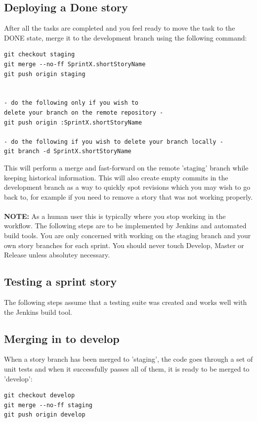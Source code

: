 \subsection{Deploying a Done story}

After all the tasks are completed and you feel ready to move the task to the DONE state, merge it to the development branch using the following command:\\

\begin{verbatim}
git checkout staging
git merge --no-ff SprintX.shortStoryName
git push origin staging


- do the following only if you wish to 
delete your branch on the remote repository -
git push origin :SprintX.shortStoryName

- do the following if you wish to delete your branch locally -  
git branch -d SprintX.shortStoryName
\end{verbatim}
This will perform a merge and fast-forward on the remote 'staging' branch while keeping historical information.
This will also create empty commits in the development branch as a way to quickly spot revisions which you may wish to go back to, for example if you need to remove a story that was not working properly.\\\\
\textbf {NOTE:}
As a human user this is typically where you stop working in the workflow. The following steps are to be implemented by Jenkins and automated build tools. You are only concerned with working on the staging branch and your own story branches for each sprint. You should never touch Develop, Master or Release unless absolutey necessary.

\subsection{Testing a sprint story}

The following steps assume that a testing suite was created and works well with the Jenkins build tool. 

\subsection{Merging in to develop}
When a story branch has been merged to 'staging', the code goes through a set of unit tests and when it successfully passes all of them, it is ready to be merged to 'develop': 
\begin{verbatim}
git checkout develop
git merge --no-ff staging
git push origin develop
\end{verbatim}

